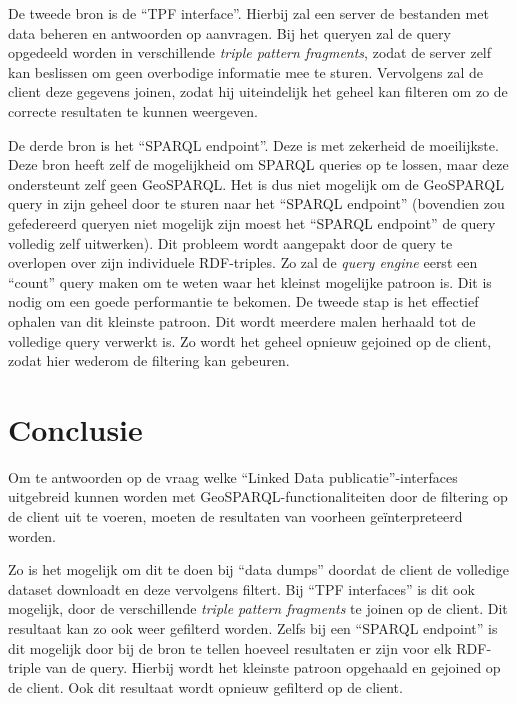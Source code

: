 \documentclass[twocolumn]{phdsymp} %
\begin{document}
De tweede bron is de ``TPF interface''. Hierbij zal een server de bestanden met data beheren en antwoorden op aanvragen. Bij het queryen zal de query opgedeeld worden in verschillende \textit{triple pattern fragments}, zodat de server zelf kan beslissen om geen overbodige informatie mee te sturen. Vervolgens zal de client deze gegevens joinen, zodat hij uiteindelijk het geheel kan filteren om zo de correcte resultaten te kunnen weergeven.

De derde bron is het ``SPARQL endpoint''. Deze is met zekerheid de moeilijkste. Deze bron heeft zelf de mogelijkheid om SPARQL queries op te lossen, maar deze ondersteunt zelf geen GeoSPARQL. Het is dus niet mogelijk om de GeoSPARQL query in zijn geheel door te sturen naar het ``SPARQL endpoint'' (bovendien zou gefedereerd queryen niet mogelijk zijn moest het ``SPARQL endpoint'' de query volledig zelf uitwerken). Dit probleem wordt aangepakt door de query te overlopen over zijn individuele RDF-triples. Zo zal de \textit{query engine} eerst een ``count'' query maken om te weten waar het kleinst mogelijke patroon is. Dit is nodig om een goede performantie te bekomen. De tweede stap is het effectief ophalen van dit kleinste patroon. Dit wordt meerdere malen herhaald tot de volledige query verwerkt is. Zo wordt het geheel opnieuw gejoined op de client, zodat hier wederom de filtering kan gebeuren.

\section{Conclusie}
Om te antwoorden op de vraag welke ``Linked Data publicatie''-interfaces uitgebreid kunnen worden met GeoSPARQL-functionaliteiten door de filtering op de client uit te voeren, moeten de resultaten van voorheen geïnterpreteerd worden. 

Zo is het mogelijk om dit te doen bij ``data dumps'' doordat de client de volledige dataset downloadt en deze vervolgens filtert. Bij ``TPF interfaces'' is dit ook mogelijk, door de verschillende \textit{triple pattern fragments} te joinen op de client. Dit resultaat kan zo ook weer gefilterd worden. Zelfs bij een ``SPARQL endpoint'' is dit mogelijk door bij de bron te tellen hoeveel resultaten er zijn voor elk RDF-triple van de query. Hierbij wordt het kleinste patroon opgehaald en gejoined op de client. Ook dit resultaat wordt opnieuw gefilterd op de client. 



\end{document}
